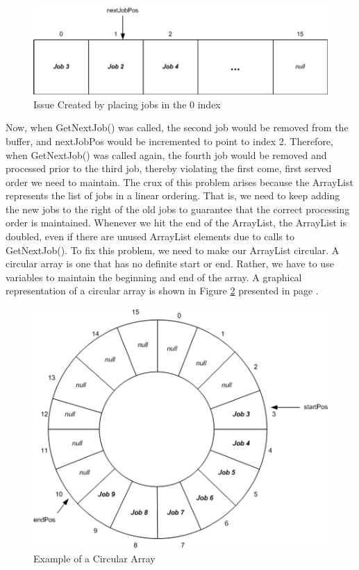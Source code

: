 \documentclass[12pt,a4paper,final,twoside,titlepage]{book}
\begin{document}
\begin{figure}
\begin{center}
\includegraphics[scale=0.75]{ArrayList-3}
\caption{Issue Created by placing jobs in the 0 index}
\label{ArrayList-3}
\end{center}
\end{figure}
Now, when GetNextJob() was called, the second job would be removed from the buffer, and nextJobPos would be incremented to point to index 2. Therefore, when GetNextJob() was called again, the fourth job would be removed and processed prior to the third job, thereby violating the first come, first served order we need to maintain. The crux of this problem arises because the ArrayList represents the list of jobs in a linear ordering. That is, we need to keep adding the new jobs to the right of the old jobs to guarantee that the correct processing order is maintained. Whenever we hit the end of the ArrayList, the ArrayList is doubled, even if there are unused ArrayList elements due to calls to GetNextJob(). To fix this problem, we need to make our ArrayList circular. A circular array is one that has no definite start or end. Rather, we have to use variables to maintain the beginning and end of the array. A graphical representation of a circular array is shown in Figure \ref{CircularArray} presented in page \pageref{CircularArray}.
\begin{figure}
\begin{center}
\includegraphics[scale=0.75]{CircularArray}
\caption{Example of a Circular Array}
\label{CircularArray}
\end{center}
\end{figure}
\end{document}

